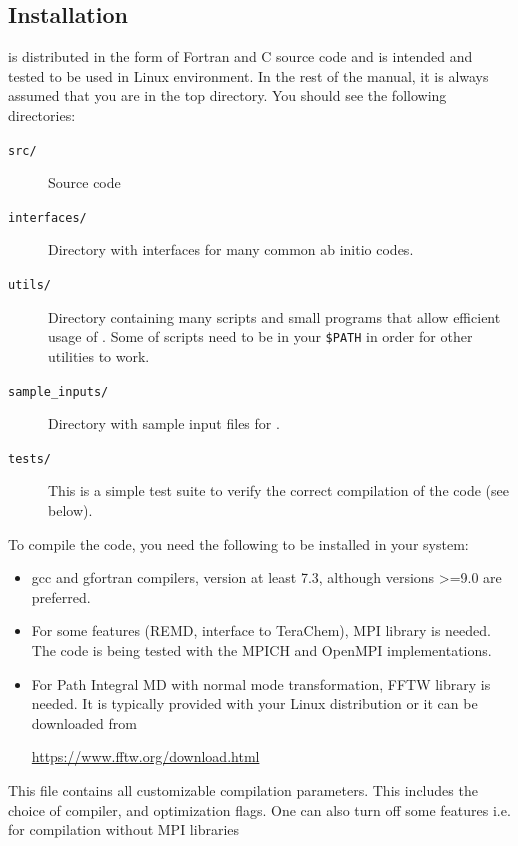 \subsection{Installation}
\abin is distributed in the form of Fortran and C source code and is intended and tested to be used in Linux environment.
In the rest of the manual, it is always assumed that you are in the top \abin directory. You should see the following directories:
\begin{description}
\item[\texttt{src/}] Source code

\item[\texttt{interfaces/}] Directory with interfaces for many common ab initio codes.

\item[\texttt{utils/}] Directory containing many scripts and small programs that allow efficient usage of \abin. Some of scripts need to be in your \verb|$PATH| in order for other utilities to work.

\item[\texttt{sample\_inputs/}] Directory with sample input files for \abin.

\item[\texttt{tests/}] This is a simple test suite to verify the correct compilation of the code (see below).
\end{description}

To compile the code, you need the following to be installed in your system:
\begin{itemize}
\item gcc and gfortran compilers, version at least 7.3, although versions >=9.0 are preferred.

\item For some features (REMD, interface to TeraChem), MPI library is needed. The code is being tested with the MPICH and OpenMPI implementations.

\item For Path Integral MD with normal mode transformation, FFTW library is needed. It is typically provided with your Linux distribution or it can be downloaded from 

\url{https://www.fftw.org/download.html}

\end{itemize}

\noindent
This file contains all customizable compilation parameters. This includes the choice of compiler, and optimization flags. One can also turn off some features i.e. for compilation without MPI libraries

